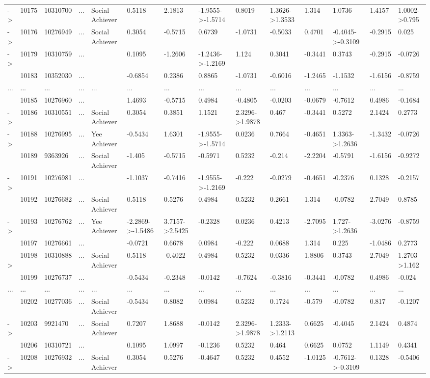 \documentclass[6pt,a4paper]{article}
\begin{document}
\begin{landscape}
{\begin{longtable}{llllllllllllll}
-\textgreater &10175&10310700&...&Social Achiever&0.5118&2.1813&-1.9555-\textgreater -1.5714&0.8019&1.3626-\textgreater 1.3533&1.314&1.0736&1.4157&1.0002-\textgreater 0.795\tabularnewline
-\textgreater &10176&10276949&...&Social Achiever&0.3054&-0.5715&0.6739&-1.0731&-0.5033&0.4701&-0.4045-\textgreater -0.3109&-0.2915&0.025\tabularnewline
-\textgreater &10179&10310759&...&&0.1095&-1.2606&-1.2436-\textgreater -1.2169&1.124&0.3041&-0.3441&0.3743&-0.2915&-0.0726\tabularnewline
&10183&10352030&...&&-0.6854&0.2386&0.8865&-1.0731&-0.6016&-1.2465&-1.1532&-1.6156&-0.8759\tabularnewline
...&...&...&...&...&...&...&...&...&...&...&...&...&...\tabularnewline
&10185&10276960&...&&1.4693&-0.5715&0.4984&-0.4805&-0.0203&-0.0679&-0.7612&0.4986&-0.1684\tabularnewline
-\textgreater &10186&10310551&...&Social Achiever&0.3054&0.3851&1.1521&2.3296-\textgreater 1.9878&0.467&-0.3441&0.5272&2.1424&0.2773\tabularnewline
-\textgreater &10188&10276995&...&Yee Achiever&-0.5434&1.6301&-1.9555-\textgreater -1.5714&0.0236&0.7664&-0.4651&1.3363-\textgreater 1.2636&-1.3432&-0.0726\tabularnewline
&10189&9363926&...&Social Achiever&-1.405&-0.5715&-0.5971&0.5232&-0.214&-2.2204&-0.5791&-1.6156&-0.9272\tabularnewline
-\textgreater &10191&10276981&...&&-1.1037&-0.7416&-1.9555-\textgreater -1.2169&-0.222&-0.0279&-0.4651&-0.2376&0.1328&-0.2157\tabularnewline
&10192&10276682&...&Social Achiever&0.5118&0.5276&0.4984&0.5232&0.2661&1.314&-0.0782&2.7049&0.8785\tabularnewline
-\textgreater &10193&10276762&...&Yee Achiever&-2.2869-\textgreater -1.5486&3.7157-\textgreater 2.5425&-0.2328&0.0236&0.4213&-2.7095&1.727-\textgreater 1.2636&-3.0276&-0.8759\tabularnewline
&10197&10276661&...&&-0.0721&0.6678&0.0984&-0.222&0.0688&1.314&0.225&-1.0486&0.2773\tabularnewline
-\textgreater &10198&10310888&...&Social Achiever&0.5118&-0.4022&0.4984&0.5232&0.0336&1.8806&0.3743&2.7049&1.2703-\textgreater 1.162\tabularnewline
&10199&10276737&...&&-0.5434&-0.2348&-0.0142&-0.7624&-0.3816&-0.3441&-0.0782&0.4986&-0.024\tabularnewline
...&...&...&...&...&...&...&...&...&...&...&...&...&...\tabularnewline
&10202&10277036&...&Social Achiever&-0.5434&0.8082&0.0984&0.5232&0.1724&-0.579&-0.0782&0.817&-0.1207\tabularnewline
-\textgreater &10203&9921470&...&Social Achiever&0.7207&1.8688&-0.0142&2.3296-\textgreater 1.9878&1.2333-\textgreater 1.2113&0.6625&-0.4045&2.1424&0.4874\tabularnewline
&10206&10310721&...&&0.1095&1.0997&-0.1236&0.5232&0.464&0.6625&0.0752&1.1149&0.4341\tabularnewline
-\textgreater &10208&10276932&...&Social Achiever&0.3054&0.5276&-0.4647&0.5232&0.4552&-1.0125&-0.7612-\textgreater -0.3109&0.1328&-0.5406\tabularnewline

\end{longtable}}
\end{landscape}
\end{document}
